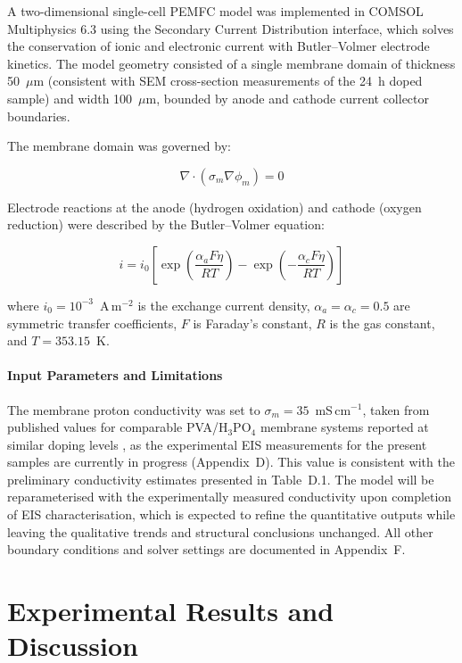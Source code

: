 \documentclass[12pt,a4paper]{report}
\begin{document}
A two-dimensional single-cell PEMFC model was implemented in COMSOL 
Multiphysics 6.3 using the Secondary Current Distribution interface, 
which solves the conservation of ionic and electronic current with 
Butler--Volmer electrode kinetics. The model geometry consisted of 
a single membrane domain of thickness 50~\(\mu\)m (consistent with 
SEM cross-section measurements of the 24~h doped sample) and width 
100~\(\mu\)m, bounded by anode and cathode current collector 
boundaries.

The membrane domain was governed by:

\begin{equation}
\nabla \cdot \left( \sigma_{m} \nabla \phi_{m} \right) = 0
\end{equation}

Electrode reactions at the anode (hydrogen oxidation) and cathode 
(oxygen reduction) were described by the Butler--Volmer equation:

\begin{equation}
i = i_0 \left[ 
\exp\!\left(\frac{\alpha_a F \eta}{RT}\right) - 
\exp\!\left(-\frac{\alpha_c F \eta}{RT}\right) 
\right]
\end{equation}

where \(i_0 = 10^{-3}\)~A\,m\(^{-2}\) is the exchange current 
density, \(\alpha_a = \alpha_c = 0.5\) are symmetric transfer 
coefficients, \(F\) is Faraday's constant, \(R\) is the gas 
constant, and \(T = 353.15\)~K.

\subsubsection{Input Parameters and Limitations}

The membrane proton conductivity was set to 
\(\sigma_{m} = 35\)~mS\,cm\(^{-1}\), taken from published values 
for comparable PVA/H\(_3\)PO\(_4\) membrane systems reported at 
similar doping levels \cite{110}, as the experimental EIS 
measurements for the present samples are currently in progress 
(Appendix~D). This value is consistent with the preliminary 
conductivity estimates presented in Table~D.1. The model will be 
reparameterised with the experimentally measured conductivity upon 
completion of EIS characterisation, which is expected to refine the 
quantitative outputs while leaving the qualitative trends and 
structural conclusions unchanged. All other boundary conditions 
and solver settings are documented in Appendix~F.

\chapter{Experimental Results and Discussion}
\end{document}
